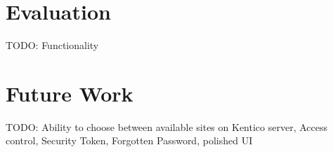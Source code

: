 \section{Evaluation}
TODO: Functionality
\section{Future Work}
TODO: Ability to choose between available sites on Kentico server, Access control, Security Token, Forgotten Password, polished UI
